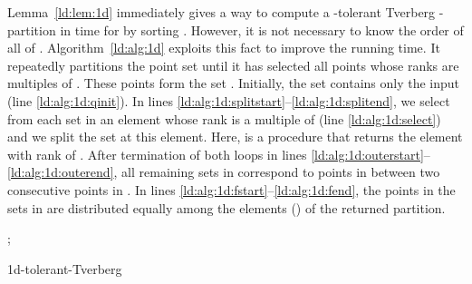 \documentclass[oribibl,envcountsame,envcountsect]{llncs}
\newenvironment{alg}{
  \begin{algorithm}[htbp]
    \SetKwInOut{Input}{input}
    \SetKwInOut{Output}{output}
  }{
  \end{algorithm}
}
\begin{document}
Lemma~\ref{ld:lem:1d} immediately gives a way to compute a -tolerant Tverberg
-partition in  time for  by sorting
. However, it is not necessary to know the order of all of .
Algorithm~\ref{ld:alg:1d} exploits this fact to improve the running time. It
repeatedly partitions the point set until it has selected all points whose
ranks are multiples of . These points form the set .
Initially, the set 
contains only the input  (line \ref{ld:alg:1d:qinit}). In lines
\ref{ld:alg:1d:splitstart}--\ref{ld:alg:1d:splitend}, we select from each set in
 an element whose rank is a multiple of  (line \ref{ld:alg:1d:select}) and
we split the set at this element. Here,  is a procedure that
returns the element with rank  of . After termination of both loops
in lines \ref{ld:alg:1d:outerstart}--\ref{ld:alg:1d:outerend}, all remaining sets
in  correspond to points in  between two consecutive points in . In
lines \ref{ld:alg:1d:fstart}--\ref{ld:alg:1d:fend}, the points in the sets in
 are distributed equally among the elements  () of the returned
partition.

\begin{alg}
  \;\label{ld:alg:1d:rstart}
  \While{}{
    \;\label{ld:alg:1d:se}\label{ld:alg:1d:rend}
  }
  ;\label{ld:alg:1d:qinit}
  \;
  \Return{}\;
  \caption{1d-tolerant-Tverberg}
  \label{ld:alg:1d}
\end{alg}
\end{document}
